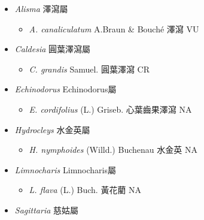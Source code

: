 
  \begin{itemize}
 \item[] \textit{Alisma} 澤瀉屬
                                
  \begin{itemize}
        \item[] \textit{A. canaliculatum} A.Braun \& Bouché  澤瀉   VU
  \end{itemize}
 \item[] \textit{Caldesia} 圓葉澤瀉屬
                                
  \begin{itemize}
        \item[] \textit{C. grandis} Samuel.  圓葉澤瀉   CR
  \end{itemize}
 \item[] \textit{Echinodorus} Echinodorus屬
                                
  \begin{itemize}
        \item[] \textit{E. cordifolius} (L.) Griseb.  心葉齒果澤瀉   NA
  \end{itemize}
 \item[] \textit{Hydrocleys} 水金英屬
                                
  \begin{itemize}
        \item[] \textit{H. nymphoides} (Willd.) Buchenau  水金英   NA
  \end{itemize}
 \item[] \textit{Limnocharis} Limnocharis屬
                                
  \begin{itemize}
        \item[] \textit{L. flava} (L.) Buch.  黃花藺   NA
  \end{itemize}
 \item[] \textit{Sagittaria} 慈姑屬
                                

\end{itemize}
